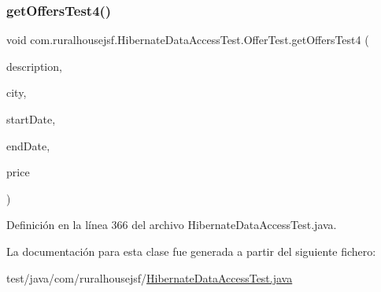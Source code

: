 \subsubsection{\texorpdfstring{getOffersTest4()}{getOffersTest4()}}
{\footnotesize\ttfamily void com.\+ruralhousejsf.\+Hibernate\+Data\+Access\+Test.\+Offer\+Test.\+get\+Offers\+Test4 (\begin{DoxyParamCaption}\item[{String}]{description,  }\item[{String}]{city,  }\item[{@Java\+Time\+Conversion\+Pattern(\char`\"{}dd/MM/yyyy\char`\"{}) Local\+Date}]{start\+Date,  }\item[{@Java\+Time\+Conversion\+Pattern(\char`\"{}dd/MM/yyyy\char`\"{}) Local\+Date}]{end\+Date,  }\item[{double}]{price }\end{DoxyParamCaption})\hspace{0.3cm}{\ttfamily [package]}}



Definición en la línea 366 del archivo Hibernate\+Data\+Access\+Test.\+java.



La documentación para esta clase fue generada a partir del siguiente fichero\+:\begin{DoxyCompactItemize}
\item 
test/java/com/ruralhousejsf/\mbox{\hyperlink{_hibernate_data_access_test_8java}{Hibernate\+Data\+Access\+Test.\+java}}\end{DoxyCompactItemize}
